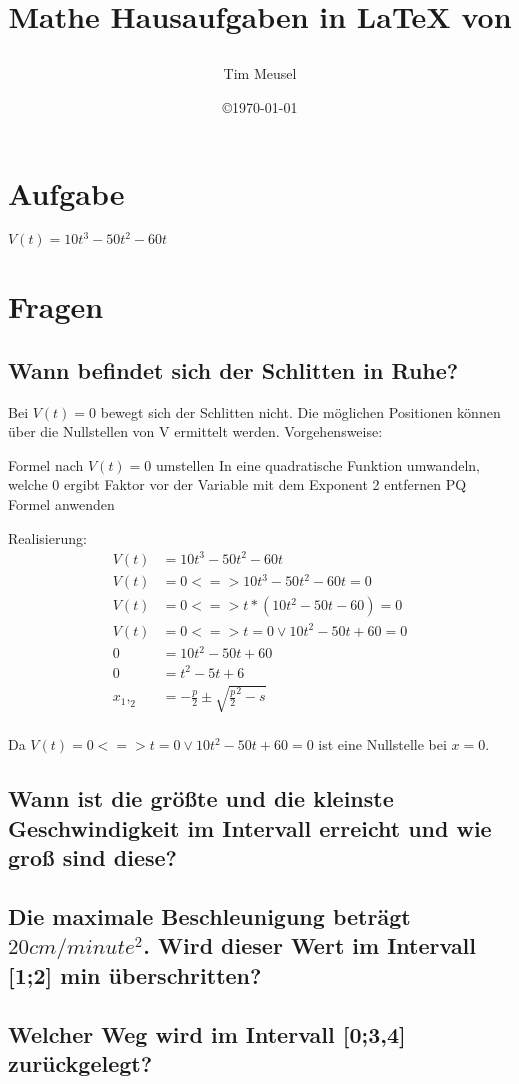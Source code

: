 \documentclass[a4paper,11pt]{scrartcl}
\author{Tim Meusel}
\title{Mathe Hausaufgaben in \LaTeX{} von \author{}}
\date{\copyright\today}
\begin{document}
\maketitle

\section{Aufgabe}

$V(t) = 10t^3 - 50t^2 - 60t$

\section{Fragen}

\subsection{Wann befindet sich der Schlitten in Ruhe?}
Bei $V(t) = 0$ bewegt sich der Schlitten nicht. Die möglichen Positionen können
über die Nullstellen von V ermittelt werden. Vorgehensweise:

\begin{outline}
  \1 Formel nach $V(t) = 0$ umstellen
  \1 In eine quadratische Funktion umwandeln, welche 0 ergibt
  \1 Faktor vor der Variable mit dem Exponent 2 entfernen
  \1 PQ Formel anwenden
\end{outline}

Realisierung:
\begin{align*}
  V(t) &= 10t^3 - 50t^2 - 60t                   \\
  V(t) &= 0 <=> 10t^3 - 50t^2 - 60t = 0         \\
  V(t) &= 0 <=> t * (10t^2 - 50t - 60) = 0      \\
  V(t) &= 0 <=> t = 0 \vee 10t^2 - 50t + 60 = 0 \\
     0 &= 10t^2 - 50t + 60                      \\
     0 &= t^2 - 5t + 6                          \\
 x_1,_2 &= -\frac{p}{2} \pm \sqrt{\frac{p}{2}^2 - s}\\
\end{align*}

Da $V(t) = 0 <=> t = 0 \vee 10t^2 - 50t + 60 = 0$ ist eine Nullstelle bei $x = 0$.

\subsection{Wann ist die größte und die kleinste Geschwindigkeit im Intervall
erreicht und wie groß sind diese?}

\subsection{Die maximale Beschleunigung beträgt $20cm / minute^2$. Wird dieser
Wert im Intervall [1;2] min überschritten?}

\subsection{Welcher Weg wird im Intervall [0;3,4] zurückgelegt?}
\end{document}
